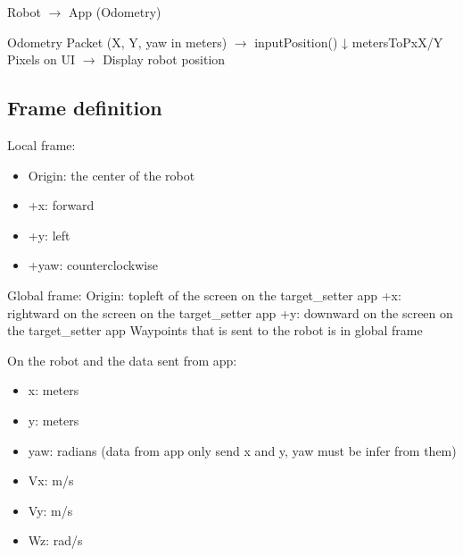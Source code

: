 \documentclass[letterpaper,10pt,english]{sphinxmanual}
\begin{document}
\sphinxAtStartPar
Robot \(\rightarrow\) App (Odometry)

\begin{sphinxVerbatim}[commandchars=\\\{\}]
Odometry Packet (X, Y, yaw in meters) \(\rightarrow\) inputPosition()
   ↓ metersToPxX/Y
Pixels on UI \(\rightarrow\) Display robot position
\end{sphinxVerbatim}


\subsection{Frame definition}
\label{\detokenize{technical_reference:frame-definition}}
\sphinxAtStartPar
Local frame:
\begin{itemize}
\item {} 
\sphinxAtStartPar
Origin: the center of the robot

\item {} 
\sphinxAtStartPar
+x: forward

\item {} 
\sphinxAtStartPar
+y: left

\item {} 
\sphinxAtStartPar
+yaw: counter\sphinxhyphen{}clockwise

\end{itemize}

\sphinxAtStartPar
Global frame:
\sphinxhyphen{} Origin: top\sphinxhyphen{}left of the screen on the target\_setter app
\sphinxhyphen{} +x: rightward on the screen on the target\_setter app
\sphinxhyphen{} +y: downward on the screen on the target\_setter app
\sphinxhyphen{} Waypoints that is sent to the robot is in global frame

\sphinxAtStartPar
{}

\sphinxAtStartPar
On the robot and the data sent from app:
\begin{itemize}
\item {} 
\sphinxAtStartPar
x: meters

\item {} 
\sphinxAtStartPar
y: meters

\item {} 
\sphinxAtStartPar
yaw: radians (data from app only send x and y, yaw must be infer from them)

\item {} 
\sphinxAtStartPar
Vx: m/s

\item {} 
\sphinxAtStartPar
Vy: m/s

\item {} 
\sphinxAtStartPar
Wz: rad/s

\end{itemize}
\end{document}
